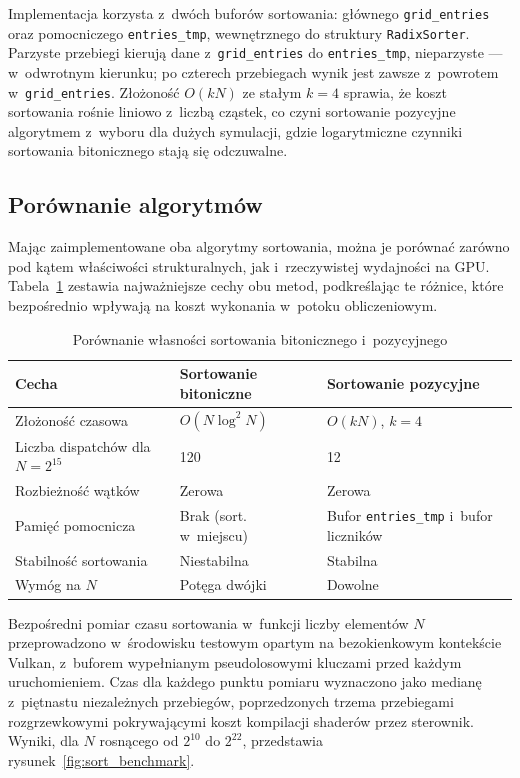Implementacja korzysta z~dwóch buforów sortowania: głównego \texttt{grid\_entries}
oraz pomocniczego \texttt{entries\_tmp}, wewnętrznego do struktury \texttt{RadixSorter}.
Parzyste przebiegi kierują dane z~\texttt{grid\_entries} do \texttt{entries\_tmp},
nieparzyste --- w~odwrotnym kierunku; po czterech przebiegach wynik jest zawsze
z~powrotem w~\texttt{grid\_entries}. Złożoność $O(kN)$ ze stałym $k=4$
sprawia, że koszt sortowania rośnie liniowo z~liczbą cząstek, co czyni sortowanie pozycyjne
algorytmem z~wyboru dla dużych symulacji, gdzie logarytmiczne czynniki sortowania
bitonicznego stają się odczuwalne.

\subsection{Porównanie algorytmów}
\label{subsec:sort_comparison}

Mając zaimplementowane oba algorytmy sortowania, można je porównać
zarówno pod kątem właściwości strukturalnych, jak i~rzeczywistej wydajności
na GPU. Tabela~\ref{tab:sort_comparison} zestawia najważniejsze cechy obu
metod, podkreślając te różnice, które bezpośrednio wpływają na koszt
wykonania w~potoku obliczeniowym.

\begin{table}[htbp]
\centering
\caption{Porównanie własności sortowania bitonicznego i~pozycyjnego}
\label{tab:sort_comparison}
\begin{tabular}{p{4.5cm}p{4.5cm}p{4.5cm}}
\toprule
\textbf{Cecha} & \textbf{Sortowanie bitoniczne} & \textbf{Sortowanie pozycyjne} \\
\midrule
Złożoność czasowa & $O(N \log^2 N)$ & $O(kN)$, $k=4$ \\[3pt]
Liczba dispatchów dla $N=2^{15}$ & 120 & 12 \\[3pt]
Rozbieżność wątków & Zerowa & Zerowa \\[3pt]
Pamięć pomocnicza & Brak (sort. w~miejscu) & Bufor \texttt{entries\_tmp} i~bufor liczników \\[3pt]
Stabilność sortowania & Niestabilna & Stabilna \\[3pt]
Wymóg na $N$ & Potęga dwójki & Dowolne \\
\bottomrule
\end{tabular}
\end{table}

Bezpośredni pomiar czasu sortowania w~funkcji liczby elementów $N$
przeprowadzono w~środowisku testowym opartym na bezokienkowym kontekście
Vulkan, z~buforem wypełnianym pseudolosowymi kluczami
przed każdym uruchomieniem. Czas dla każdego punktu pomiaru wyznaczono jako
medianę z~piętnastu niezależnych przebiegów, poprzedzonych trzema przebiegami
rozgrzewkowymi pokrywającymi koszt kompilacji shaderów przez sterownik.
Wyniki, dla $N$ rosnącego od $2^{10}$ do $2^{22}$, przedstawia
rysunek~\ref{fig:sort_benchmark}.


